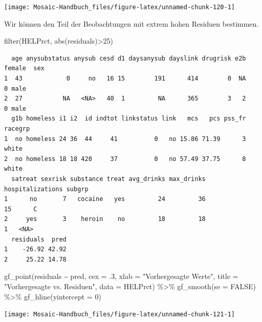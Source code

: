 \documentclass[
  ngerman,
]{scrbook}
\newenvironment{Shaded}{\begin{snugshade}}{\end{snugshade}}
\newcommand{\AttributeTok}[1]{\textcolor[rgb]{0.77,0.63,0.00}{#1}}
\newcommand{\ConstantTok}[1]{\textcolor[rgb]{0.00,0.00,0.00}{#1}}
\newcommand{\DecValTok}[1]{\textcolor[rgb]{0.00,0.00,0.81}{#1}}
\newcommand{\FunctionTok}[1]{\textcolor[rgb]{0.00,0.00,0.00}{#1}}
\newcommand{\NormalTok}[1]{#1}
\newcommand{\SpecialCharTok}[1]{\textcolor[rgb]{0.00,0.00,0.00}{#1}}
\newcommand{\StringTok}[1]{\textcolor[rgb]{0.31,0.60,0.02}{#1}}
\begin{document}
\begin{center}\texttt{[image: Mosaic-Handbuch\_files/figure-latex/unnamed-chunk-120-1]} \end{center}

Wir können den Teil der Beobachtungen mit extrem hohen Residuen bestimmen.

\begin{Shaded}
\begin{Highlighting}[]
\FunctionTok{filter}\NormalTok{(HELPrct, }\FunctionTok{abs}\NormalTok{(residuals)}\SpecialCharTok{\textgreater{}}\DecValTok{25}\NormalTok{)}
\end{Highlighting}
\end{Shaded}

\begin{verbatim}
  age anysubstatus anysub cesd d1 daysanysub dayslink drugrisk e2b female  sex
1  43            0     no   16 15        191      414        0  NA      0 male
2  27           NA   <NA>   40  1         NA      365        3   2      0 male
  g1b homeless i1 i2  id indtot linkstatus link   mcs   pcs pss_fr racegrp
1  no homeless 24 36  44     41          0   no 15.86 71.39      3   white
2  no homeless 18 18 420     37          0   no 57.49 37.75      8   white
  satreat sexrisk substance treat avg_drinks max_drinks hospitalizations subgrp
1      no       7   cocaine   yes         24         36               15      C
2     yes       3    heroin    no         18         18                1   <NA>
  residuals  pred
1    -26.92 42.92
2     25.22 14.78
\end{verbatim}

\begin{Shaded}
\begin{Highlighting}[]
\FunctionTok{gf\_point}\NormalTok{(residuals }\SpecialCharTok{\textasciitilde{}}\NormalTok{ pred, }\AttributeTok{cex =}\NormalTok{ .}\DecValTok{3}\NormalTok{, }\AttributeTok{xlab =} \StringTok{"Vorhergesagte Werte"}\NormalTok{,}
         \AttributeTok{title =} \StringTok{"Vorhergesagte vs. Residuen"}\NormalTok{, }\AttributeTok{data =}\NormalTok{ HELPrct) }\SpecialCharTok{\%\textgreater{}\%}
  \FunctionTok{gf\_smooth}\NormalTok{(}\AttributeTok{se =} \ConstantTok{FALSE}\NormalTok{) }\SpecialCharTok{\%\textgreater{}\%} 
  \FunctionTok{gf\_hline}\NormalTok{(}\AttributeTok{yintercept =} \DecValTok{0}\NormalTok{)}
\end{Highlighting}
\end{Shaded}

\begin{center}\texttt{[image: Mosaic-Handbuch\_files/figure-latex/unnamed-chunk-121-1]} \end{center}
\end{document}
